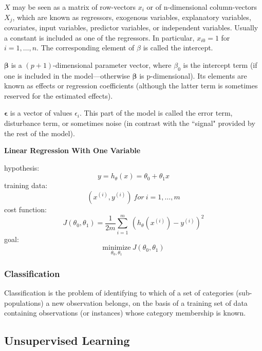 \documentclass{article}
\begin{document}
\bigskip

\noindent \(X\) may be seen as a matrix of row-vectors \(x_{i}\) or of n-dimensional column-vectors \(X_{j}\), which are known as regressors, exogenous variables, explanatory variables, covariates, input variables, predictor variables, or independent variables. Usually a constant is included as one of the regressors. In particular, \(x_{i0} = 1\) for \(i = 1, \dots, n\). The corresponding element of \(\beta\) is called the intercept. 

\bigskip

\noindent \(\boldsymbol{\beta}\) is a \((p + 1)\)-dimensional parameter vector, where \(\beta_{0}\) is the intercept term (if one is included in the model—otherwise \(\boldsymbol{\beta}\) is p-dimensional). Its elements are known as effects or regression coefficients (although the latter term is sometimes reserved for the estimated effects).

\bigskip

\noindent \(\boldsymbol{\epsilon}\) is a vector of values \(\epsilon_{i}\). This part of the model is called the error term, disturbance term, or sometimes noise (in contrast with the ``signal" provided by the rest of the model).

\bigskip

\noindent \textbf{Linear Regression With One Variable}

\bigskip

\noindent hypothesis:
\[y = h_{\theta}(x) = \theta_0 + \theta_1x\]
\noindent training data:
\[(x^{(i)}, y^{(i)})\:for\:i = 1, \dots, m\]
\noindent cost function:
\[J(\theta_0, \theta_1) = \frac{1}{2m} \sum_{i = 1}^m\ (h_{\theta}(x^{(i)}) - y^{(i)})^2\]
\noindent goal:
\[\underset{\theta_0, \theta_1}{\text{minimize}} \: J(\theta_0, \theta_1)\]

\subsubsection{Classification}

Classification is the problem of identifying to which 
of a set of categories (sub-populations) a new observation 
belongs, on the basis of a training set of data containing 
observations (or instances) whose category membership is known.

\subsection{Unsupervised Learning}
\end{document}
